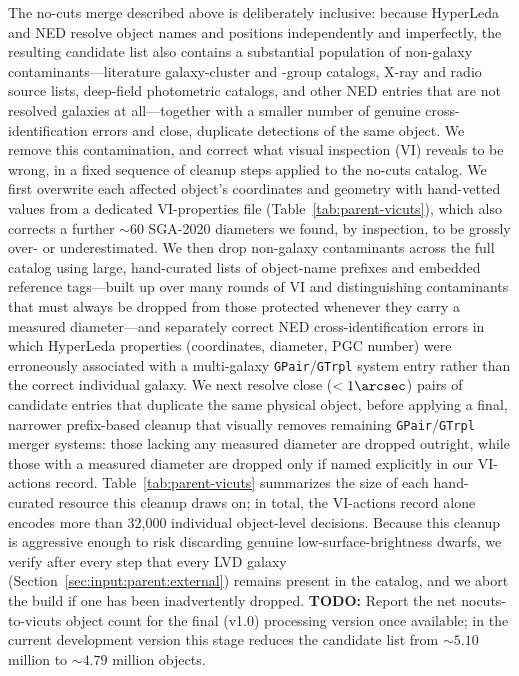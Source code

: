 \documentclass[modern,linenumbers]{aastex701}
\newcommand{\todo}[1]{{\color{red}\textbf{TODO:} #1}}
\begin{document}
The no-cuts merge described above is deliberately inclusive: because
HyperLeda and NED resolve object names and positions independently and
imperfectly, the resulting candidate list also contains a substantial
population of non-galaxy contaminants---literature galaxy-cluster and
-group catalogs, X-ray and radio source lists, deep-field photometric
catalogs, and other NED entries that are not resolved galaxies at all---together
with a smaller number of genuine cross-identification errors
and close, duplicate detections of the same object. We remove this
contamination, and correct what visual inspection (VI) reveals to be
wrong, in a fixed sequence of cleanup steps applied to the no-cuts
catalog. We first overwrite each affected object's coordinates and
geometry with hand-vetted values from a dedicated VI-properties file
(Table~\ref{tab:parent-vicuts}), which also corrects a further $\sim\!60$
SGA-2020 diameters we found, by inspection, to be grossly over- or
underestimated. We then drop non-galaxy contaminants across the full
catalog using large, hand-curated lists of object-name prefixes and
embedded reference tags---built up over many rounds of VI and
distinguishing contaminants that must always be dropped from those
protected whenever they carry a measured diameter---and separately
correct NED cross-identification errors in which HyperLeda properties
(coordinates, diameter, PGC number) were erroneously associated with a
multi-galaxy \texttt{GPair}/\texttt{GTrpl} system entry rather than the
correct individual galaxy. We next resolve close ($<1\arcsec$) pairs of
candidate entries that duplicate the same physical object, before
applying a final, narrower prefix-based cleanup that visually removes
remaining \texttt{GPair}/\texttt{GTrpl} merger systems: those lacking any
measured diameter are dropped outright, while those with a measured
diameter are dropped only if named explicitly in our VI-actions record.
Table~\ref{tab:parent-vicuts} summarizes the size of each hand-curated
resource this cleanup draws on; in total, the VI-actions record alone
encodes more than 32,000 individual object-level decisions. Because
this cleanup is aggressive enough to risk discarding genuine
low-surface-brightness dwarfs, we verify after every step that every
LVD galaxy (Section~\ref{sec:input:parent:external}) remains present in
the catalog, and we abort the build if one has been inadvertently
dropped. \todo{Report the net nocuts-to-vicuts object count for the
  final (v1.0) processing version once available; in the current
  development version this stage reduces the candidate list from
  $\sim\!5.10$ million to $\sim\!4.79$ million objects.}
\end{document}
